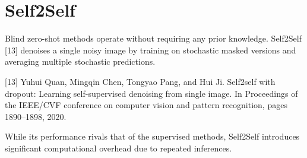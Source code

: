 \chapter{Self2Self}

Blind zero-shot methods operate without requiring any prior
knowledge. Self2Self [13] denoises a single noisy image by training on
stochastic masked versions and averaging multiple stochastic
predictions. %

[13] Yuhui Quan, Mingqin Chen, Tongyao Pang, and Hui Ji. Self2self with dropout: Learning self-supervised denoising from single image. In Proceedings of the IEEE/CVF conference on computer vision and pattern recognition,
pages 1890–1898, 2020.

While its performance rivals that of the supervised methods, Self2Self introduces significant computational
overhead due to repeated inferences.


